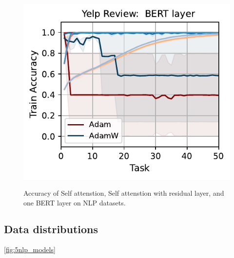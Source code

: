 \begin{figure}[t]
{    \includegraphics[width=\textwidth]{figs/Accuracy/nlp/bert_layer/yelp_review_full_40.pdf}
    }

    \caption{Accuracy of Self attenstion, Self attenstion with residual layer, and one BERT layer on NLP datasets.}
    \label{fig:nlp_self_res}
\end{figure}


\subsection{Data distributions}
\autoref{fig:5nlp_models}

